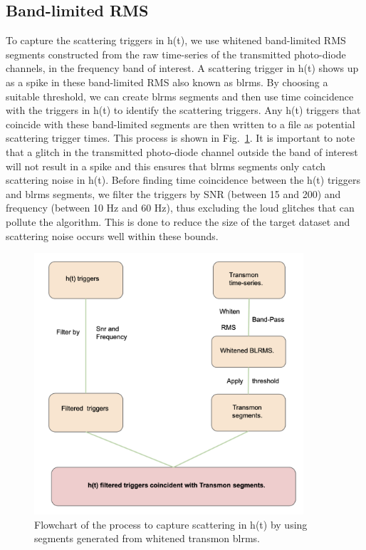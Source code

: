 \documentclass[12pt]{iopart}
\begin{document}
\subsection{Band-limited RMS}
To capture the scattering triggers in h(t), we use whitened band-limited RMS segments constructed from the raw time-series of the transmitted photo-diode channels, in the frequency band of interest. A scattering trigger in h(t) shows up as a spike in these band-limited RMS also known as blrms. By choosing a suitable threshold, we can create blrms segments and then use time coincidence with the triggers in h(t) to identify the scattering triggers. Any h(t) triggers that coincide with these band-limited segments are then written to a file as potential scattering trigger times.  This process is shown in Fig.~\ref{fig:flow}. It is important to note that a glitch in the transmitted photo-diode channel outside the band of interest will not result in a spike and this ensures that blrms segments only catch scattering noise in h(t). Before finding time coincidence between the h(t) triggers and blrms segments, we filter the triggers by SNR (between 15 and 200) and frequency (between 10 Hz and 60 Hz), thus excluding the loud glitches that can pollute the algorithm. This is done to reduce the size of the target dataset and scattering noise occurs well within these bounds. 


\quad
\begin{figure}[h]
    \centering
    \includegraphics[width=10cm]{flow.png}
    \caption{Flowchart of the process to capture scattering in h(t) by using segments generated from whitened transmon blrms.}
    \label{fig:flow}
\end{figure}
\end{document}
